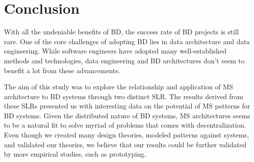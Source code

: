 \documentclass[a4paper,11pt,article,oneside]{memoir}
\begin{document}
\chapter{Conclusion}

With all the undeniable benefits of BD, the success rate of BD projects is still rare. One of the core challenges of adopting BD lies in data architecture and data engineering. While software engineers have adopted many well-established methods and technologies, data engineering and BD architectures don't seem to benefit a lot from these advancements. 

The aim of this study was to explore the relationship and application of MS architecture to BD systems through two distinct SLR. The results derived from these SLRs presented us with interesting data on the potential of MS patterns for BD systems. Given the distributed nature of BD systems, MS architectures seems to be a natural fit to solve myriad of problems that comes with decentralization. Even though we created many design theories, modeled patterns against systems, and validated our theories, we believe that our results could be further validated by more empirical studies, such as prototyping.





\printbibliography
\end{document}

